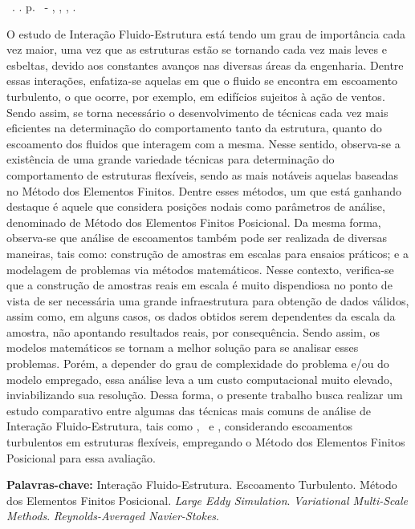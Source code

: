 \setlength{\absparsep}{18pt} %
\begin{resumo}
  \begin{flushleft}
      \setlength{\absparsep}{0pt} %
      \SingleSpacing
      \Autorabr\ \textbf{\Titulo}.	\the\year. \pageref{LastPage}p.
      \Tipotrabalho\ - \Unidademin, \Universidade, \Local, \the\year.
  \end{flushleft}
  \OnehalfSpacing

  O estudo de Interação Fluido-Estrutura está tendo um grau de importância cada vez maior, uma vez que as estruturas estão se tornando cada vez mais leves e esbeltas, devido aos constantes avanços nas diversas áreas da engenharia. Dentre essas interações, enfatiza-se aquelas em que o fluido se encontra em escoamento turbulento, o que ocorre, por exemplo, em edifícios sujeitos à ação de ventos. Sendo assim, se torna necessário o desenvolvimento de técnicas cada vez mais eficientes na determinação do comportamento tanto da estrutura, quanto do escoamento dos fluidos que interagem com a mesma. Nesse sentido, observa-se a existência de uma grande variedade técnicas para determinação do comportamento de estruturas flexíveis, sendo as mais notáveis aquelas baseadas no Método dos Elementos Finitos. Dentre esses métodos, um que está ganhando destaque é aquele que considera posições nodais como parâmetros de análise, denominado de Método dos Elementos Finitos Posicional. Da mesma forma, observa-se que análise de escoamentos também pode ser realizada de diversas maneiras, tais como: construção de amostras em escalas para ensaios práticos; e a modelagem de problemas via métodos matemáticos. Nesse contexto, verifica-se que a construção de amostras reais em escala é muito dispendiosa no ponto de vista de ser necessária uma grande infraestrutura para obtenção de dados válidos, assim como, em alguns casos, os dados obtidos serem dependentes da escala da amostra, não apontando resultados reais, por consequência. Sendo assim, os modelos matemáticos se tornam a melhor solução para se analisar esses problemas. Porém, a depender do grau de complexidade do problema e/ou do modelo empregado, essa análise leva a um custo computacional muito elevado, inviabilizando sua resolução. Dessa forma, o presente trabalho busca realizar um estudo comparativo entre algumas das técnicas mais comuns de análise de Interação Fluido-Estrutura, tais como \RANS, \LES\ e \VMS, considerando escoamentos turbulentos em estruturas flexíveis, empregando o Método dos Elementos Finitos Posicional para essa avaliação.

  \textbf{Palavras-chave:} Interação Fluido-Estrutura. Escoamento Turbulento. Método dos Elementos Finitos Posicional. \textit{Large Eddy Simulation}. \textit{Variational Multi-Scale Methods}. \textit{Reynolds-Averaged Navier-Stokes}.
\end{resumo}
